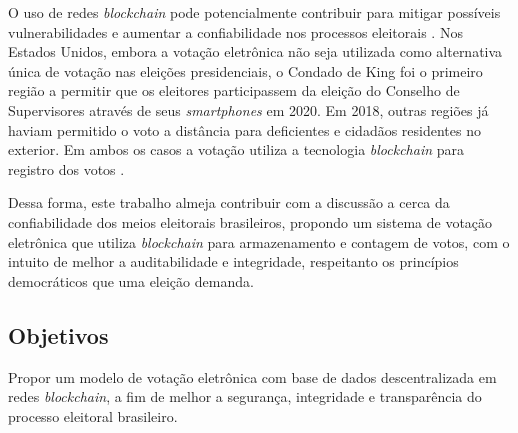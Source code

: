 \documentclass[portuguese]{textolivre}
\begin{document}
	
	O uso de redes \textit{blockchain} pode potencialmente contribuir para mitigar possíveis vulnerabilidades e aumentar a confiabilidade nos processos eleitorais \cite{electronics13010017, 10061373, 9812616, 10.1007/978-981-19-1976-3_18, Tanwar2024}. Nos Estados Unidos, embora a votação eletrônica não seja utilizada como alternativa única de votação nas eleições presidenciais, o Condado de King foi o primeiro região a permitir que os eleitores participassem da eleição do Conselho de Supervisores através de seus \emph{smartphones} em 2020. Em 2018, outras regiões já haviam permitido o voto a distância para deficientes e cidadãos residentes no exterior. Em ambos os casos a votação utiliza a tecnologia \emph{blockchain} para registro dos votos \cite{fornasier2022democracia}.
	
	Dessa forma, este trabalho almeja contribuir com a discussão a cerca da confiabilidade dos meios eleitorais brasileiros, propondo um sistema de votação eletrônica que utiliza \emph{blockchain} para armazenamento e contagem de votos, com o intuito de melhor a auditabilidade e integridade, respeitanto os princípios democráticos que uma eleição demanda.
	
	\subsection{Objetivos \label{sec-objectives}}
	
	Propor um modelo de votação eletrônica com base de dados descentralizada em redes \emph{blockchain}, a fim de melhor a segurança, integridade e transparência do processo eleitoral brasileiro.
	
\end{document}
